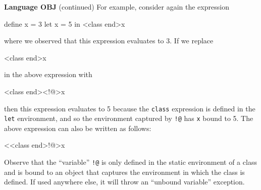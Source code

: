 \begin{minipage}[t]{\sw}
\slidenumber
\LARGE
{\bf Language OBJ} (continued)\exx
For example, consider again the expression
{\Large
\begin{qv}
define x = 3
let
  x = 5
in
  <class end>x
\end{qv}
}
where we observed that this expression evaluates to 3.
If we replace
{\Large
\begin{qv}
<class end>x
\end{qv}
}
in the above expression with
{\Large
\begin{qv}
<class end><!@>x
\end{qv}
}
then this expression evaluates to 5
because the \verb'class' expression is defined
in the \verb'let' environment,
and so the environment captured by \verb'!@'
has \verb'x' bound to 5.
The above expression can also be written as follows:
{\Large
\begin{qv}
<<class end>!@>x
\end{qv}
}
Observe that the ``variable'' \verb'!@' is only defined
in the static environment of a class
and is bound to an object that captures
the environment in which the class is defined.
If used anywhere else, it will throw an ``unbound variable'' exception.
\end{minipage}
